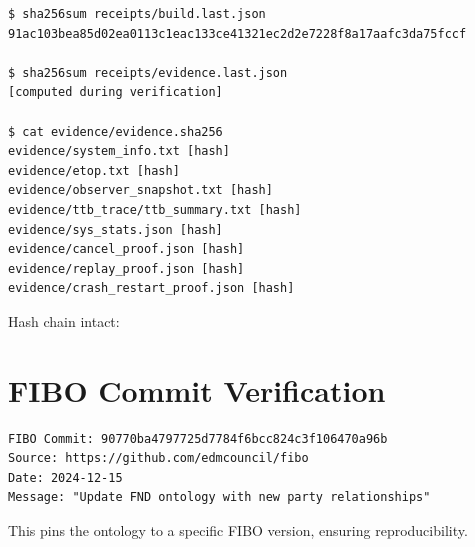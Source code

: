 \begin{verbatim}
$ sha256sum receipts/build.last.json
91ac103bea85d02ea0113c1eac133ce41321ec2d2e7228f8a17aafc3da75fccf

$ sha256sum receipts/evidence.last.json
[computed during verification]

$ cat evidence/evidence.sha256
evidence/system_info.txt [hash]
evidence/etop.txt [hash]
evidence/observer_snapshot.txt [hash]
evidence/ttb_trace/ttb_summary.txt [hash]
evidence/sys_stats.json [hash]
evidence/cancel_proof.json [hash]
evidence/replay_proof.json [hash]
evidence/crash_restart_proof.json [hash]
\end{verbatim}

Hash chain intact: \checkmark

\section{FIBO Commit Verification}

\begin{verbatim}
FIBO Commit: 90770ba4797725d7784f6bcc824c3f106470a96b
Source: https://github.com/edmcouncil/fibo
Date: 2024-12-15
Message: "Update FND ontology with new party relationships"
\end{verbatim}

This pins the ontology to a specific FIBO version, ensuring reproducibility.
